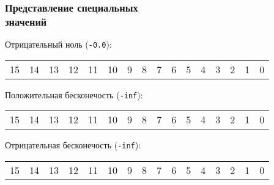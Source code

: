 \documentclass[compress, 8pt]{beamer}
\newenvironment{sixteenbit}{%
    \begin{center}
        \begin{tabular}{ |m{0.2cm}|m{0.2cm}|m{0.2cm}|m{0.2cm}|m{0.2cm}|m{0.2cm}|m{0.2cm}|m{0.2cm}|m{0.2cm}|m{0.2cm}|m{0.2cm}|m{0.2cm}|m{0.2cm}|m{0.2cm}|m{0.2cm}|m{0.2cm}|  }
            \hline
}{
        \hline
        \multicolumn{1}{c}{\color{gray}\tiny{15}} &
        \multicolumn{1}{c}{\color{gray}\tiny{14}} &
        \multicolumn{1}{c}{\color{gray}\tiny{13}} &
        \multicolumn{1}{c}{\color{gray}\tiny{12}} &
        \multicolumn{1}{c}{\color{gray}\tiny{11}} &
        \multicolumn{1}{c}{\color{gray}\tiny{10}} &
        \multicolumn{1}{c}{\color{gray}\tiny{9}} &
        \multicolumn{1}{c}{\color{gray}\tiny{8}} &
        \multicolumn{1}{c}{\color{gray}\tiny{7}} &
        \multicolumn{1}{c}{\color{gray}\tiny{6}} &
        \multicolumn{1}{c}{\color{gray}\tiny{5}} &
        \multicolumn{1}{c}{\color{gray}\tiny{4}} &
        \multicolumn{1}{c}{\color{gray}\tiny{3}} &
        \multicolumn{1}{c}{\color{gray}\tiny{2}} &
        \multicolumn{1}{c}{\color{gray}\tiny{1}} &
        \multicolumn{1}{c}{\color{gray}\tiny{0}} \\
        \end{tabular}
    \end{center}
}
\begin{document}
\begin{frame}[fragile]

    \frametitle{Представление специальных \\ значений}

    Отрицательный ноль (\verb|-0.0|):

    \begin{sixteenbit}
        \cellcolor{blue!40!white}{1} &
        \cellcolor{green!40!white}{0} &
        \cellcolor{green!40!white}{0} &
        \cellcolor{green!40!white}{0} &
        \cellcolor{green!40!white}{0} &
        \cellcolor{green!40!white}{0} &
        \cellcolor{red!40!white}{0} &
        \cellcolor{red!40!white}{0} &
        \cellcolor{red!40!white}{0} &
        \cellcolor{red!40!white}{0} &
        \cellcolor{red!40!white}{0} &
        \cellcolor{red!40!white}{0} &
        \cellcolor{red!40!white}{0} &
        \cellcolor{red!40!white}{0} &
        \cellcolor{red!40!white}{0} &
        \cellcolor{red!40!white}{0} \\
    \end{sixteenbit}

    Положительная бесконечость (\verb|-inf|):

    \begin{sixteenbit}
        \cellcolor{blue!40!white}{0} &
        \cellcolor{green!40!white}{1} &
        \cellcolor{green!40!white}{1} &
        \cellcolor{green!40!white}{1} &
        \cellcolor{green!40!white}{1} &
        \cellcolor{green!40!white}{1} &
        \cellcolor{red!40!white}{0} &
        \cellcolor{red!40!white}{0} &
        \cellcolor{red!40!white}{0} &
        \cellcolor{red!40!white}{0} &
        \cellcolor{red!40!white}{0} &
        \cellcolor{red!40!white}{0} &
        \cellcolor{red!40!white}{0} &
        \cellcolor{red!40!white}{0} &
        \cellcolor{red!40!white}{0} &
        \cellcolor{red!40!white}{0} \\
    \end{sixteenbit}

    Отрицательная бесконечость (\verb|-inf|):

    \begin{sixteenbit}
        \cellcolor{blue!40!white}{1} &
        \cellcolor{green!40!white}{1} &
        \cellcolor{green!40!white}{1} &
        \cellcolor{green!40!white}{1} &
        \cellcolor{green!40!white}{1} &
        \cellcolor{green!40!white}{1} &
        \cellcolor{red!40!white}{0} &
        \cellcolor{red!40!white}{0} &
        \cellcolor{red!40!white}{0} &
        \cellcolor{red!40!white}{0} &
        \cellcolor{red!40!white}{0} &
        \cellcolor{red!40!white}{0} &
        \cellcolor{red!40!white}{0} &
        \cellcolor{red!40!white}{0} &
        \cellcolor{red!40!white}{0} &
        \cellcolor{red!40!white}{0} \\
    \end{sixteenbit}


\end{frame}
\end{document}
